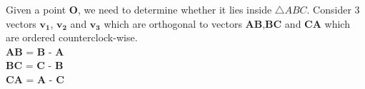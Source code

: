 \documentclass{beamer}
\renewcommand{\vec}[1]{\mathbf{#1}}
\begin{document}
\begin{frame}[fragile]
\begin{columns}
\begin{column}{0.5\textwidth}
Given a point $\vec{O}$, we need to determine whether it lies inside $\triangle ABC$. Consider 3 vectors $\vec{v_1}$, $\vec{v_2}$ and $\vec{v_3}$ which are orthogonal to vectors $\vec{AB}$,$\vec{BC}$ and $\vec{CA}$ which are ordered counterclock-wise.\\
$\vec{AB}$ = $\vec{B}$ - $\vec{A}$ \\
$\vec{BC}$ = $\vec{C}$ - $\vec{B}$\\
$\vec{CA}$ = $\vec{A}$ - $\vec{C}$\\
   
\end{column}
\end{columns}
\end{frame}
\end{document}
